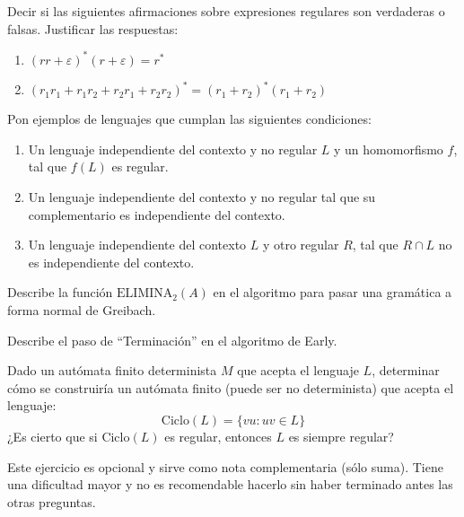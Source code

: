 \documentclass[12pt]{article}
\begin{document}
    \begin{ejercicio}[1.25 puntos]
        Decir si las siguientes afirmaciones sobre expresiones regulares son verdaderas o falsas. Justificar las respuestas:
        \begin{enumerate}
            \item $(rr + \varepsilon)^* (r + \varepsilon) = r^*$
            \item $(r_1 r_1 + r_1 r_2 + r_2 r_1 + r_2 r_2)^* = (r_1 + r_2)^* (r_1 + r_2)$
        \end{enumerate}
    \end{ejercicio}

    \begin{ejercicio}[1.25 puntos]
        Pon ejemplos de lenguajes que cumplan las siguientes condiciones:
        \begin{enumerate}
            \item Un lenguaje independiente del contexto y no regular $L$ y un homomorfismo $f$, tal que $f(L)$ es regular.
            \item Un lenguaje independiente del contexto y no regular tal que su complementario es independiente del contexto.
            \item Un lenguaje independiente del contexto $L$ y otro regular $R$, tal que $R \cap L$ no es independiente del contexto.
        \end{enumerate}
    \end{ejercicio}

    \begin{ejercicio}[1.25 puntos]
        Describe la función $\text{ELIMINA}_2(A)$ en el algoritmo para pasar una gramática a forma normal de Greibach.
    \end{ejercicio}

    \begin{ejercicio}[1.25 puntos]
        Describe el paso de ``Terminación'' en el algoritmo de Early.
    \end{ejercicio}

    \begin{ejercicio}[1 punto]
        Dado un autómata finito determinista $M$ que acepta el lenguaje $L$, determinar cómo se construiría un autómata finito (puede ser no determinista) que acepta el lenguaje:
        \[
            \text{Ciclo}(L) = \{vu : uv \in L\}
        \]
        ¿Es cierto que si $\text{Ciclo}(L)$ es regular, entonces $L$ es siempre regular?
        \begin{observacion}
            Este ejercicio es opcional y sirve como nota complementaria (sólo suma). Tiene una dificultad mayor y no es recomendable
            hacerlo sin haber terminado antes las otras preguntas.
        \end{observacion}
    \end{ejercicio}
\end{document}
